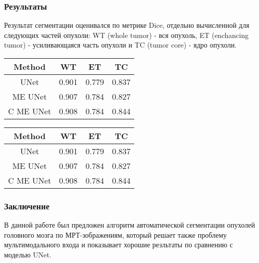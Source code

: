 \subsubsection*{Результаты}

Результат сегментации  оценивался по метрике Dice, отдельно вычисленной
для следующих частей опухоли: WT (whole tumor) -  вся опухоль, ET (enchancing tumor) - 
усиливающаяся часть опухоли и TC (tumor core) - ядро опухоли. \\
 
\begin{center}
\begin{tabular}{|c|c|c|c|}
    \hline
    Method & WT & ET & TC\\
    \hline
    UNet & 0.901 & 0.779 & 0.837 \\
    ME UNet & 0.907 & 0.784 & 0.827\\
    C ME UNet & 0.908 & 0.784 & 0.844\\
    \hline
\end{tabular}

\end{center}



\begin{center}
    

\begin{tabular}{|c|c|c|c|}
\hline
Method & WT & ET & TC\\
\hline
UNet & 0.901 & 0.779 & 0.837 \\
ME UNet & 0.907 & 0.784 & 0.827\\
C ME UNet & 0.908 & 0.784 & 0.844\\
\hline
\end{tabular}

\end{center}


\subsubsection*{Заключение}

В данной работе был предложен алгоритм автоматической сегментации 
опухолей головного мозга по МРТ-зображениям, который решает также проблему
мультимодального входа и показывает хорошие резльтаты по сравнению с моделью UNet.


